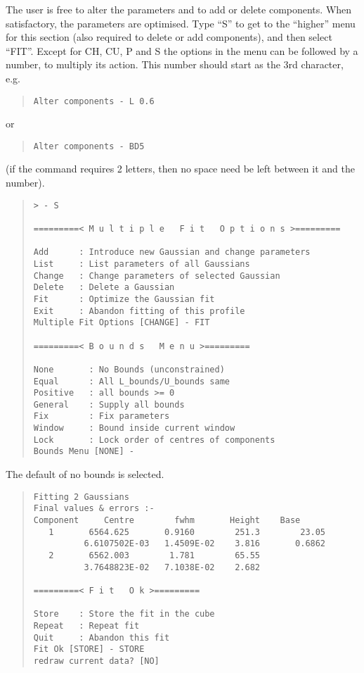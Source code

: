 The user is free to alter the parameters and to add or delete
components. When satisfactory, the parameters are optimised. Type ``S''
to get to the ``higher'' menu for this section (also required to delete
or add components), and then select ``FIT''. Except for CH, CU, P and S
the options in the menu can be followed by a number, to multiply its
action. This number should start as the 3rd character, e.g.
\begin{quote}\begin{verbatim}
Alter components - L 0.6
\end{verbatim}\end{quote}
or
\begin{quote}\begin{verbatim}
Alter components - BD5
\end{verbatim}\end{quote}
(if the command requires 2 letters, then no space need be left between
it and the number).
\begin{quote}\begin{verbatim}
> - S

=========< M u l t i p l e   F i t   O p t i o n s >=========
 
Add      : Introduce new Gaussian and change parameters
List     : List parameters of all Gaussians
Change   : Change parameters of selected Gaussian
Delete   : Delete a Gaussian
Fit      : Optimize the Gaussian fit
Exit     : Abandon fitting of this profile
Multiple Fit Options [CHANGE] - FIT
 
=========< B o u n d s   M e n u >=========
 
None       : No Bounds (unconstrained)
Equal      : All L_bounds/U_bounds same
Positive   : all bounds >= 0
General    : Supply all bounds
Fix        : Fix parameters
Window     : Bound inside current window
Lock       : Lock order of centres of components
Bounds Menu [NONE] -
\end{verbatim}\end{quote}
The default of no bounds is selected.
\begin{quote}\begin{verbatim}
Fitting 2 Gaussians
Final values & errors :-
Component     Centre        fwhm       Height    Base
   1       6564.625       0.9160        251.3        23.05
          6.6107502E-03   1.4509E-02    3.816       0.6862
   2       6562.003        1.781        65.55
          3.7648823E-02   7.1038E-02    2.682
 
=========< F i t   O k >=========
 
Store    : Store the fit in the cube
Repeat   : Repeat fit
Quit     : Abandon this fit
Fit Ok [STORE] - STORE
redraw current data? [NO]
\end{verbatim}\end{quote}

